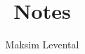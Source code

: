 \documentclass[twocolumn]{article}
\begin{document}
\title{Notes}
\author{Maksim Levental}
\maketitle
\tableofcontents

\newpage


\newpage


\newpage
\printbibliography

\newpage
\printindex
\end{document}
